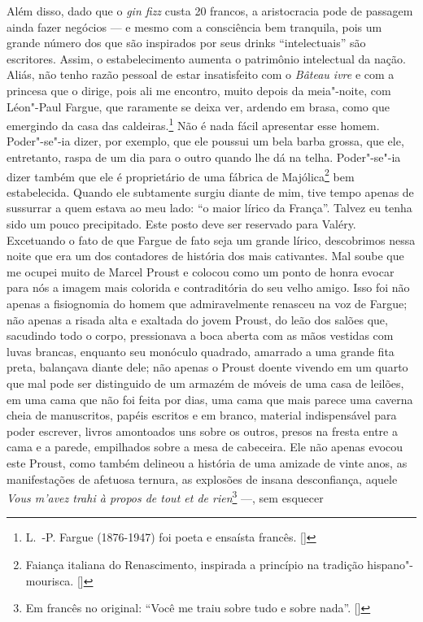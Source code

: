 Além disso, dado que o \emph{gin fizz} custa 20 francos, a aristocracia
pode de passagem ainda fazer negócios --- e mesmo com a consciência bem
tranquila, pois um grande número dos que são inspirados por seus
drinks ``intelectuais'' são escritores. Assim, o estabelecimento aumenta o patrimônio intelectual da nação. Aliás, não tenho razão pessoal de estar insatisfeito
com o \emph{Bâteau ivre} e com a princesa que o dirige, pois ali me
encontro, muito depois da meia"-noite, com Léon"-Paul Fargue, que raramente se deixa ver, ardendo em brasa, como que emergindo da casa das
caldeiras.\footnote{L.~-P. Fargue (1876-1947) foi poeta e
  ensaísta francês. []} Não é nada fácil apresentar esse homem.
Poder"-se"-ia dizer, por exemplo, que ele poussui um bela barba grossa,
que ele, entretanto, raspa de um dia para o outro quando lhe dá na
telha. Poder"-se"-ia dizer também que ele é proprietário de uma fábrica de
Majólica\footnote{Faiança italiana do Renascimento, inspirada a
  princípio na tradição hispano"-mourisca. []} bem estabelecida. Quando ele
subtamente surgiu diante de mim, tive tempo apenas de sussurrar a quem
estava ao meu lado: ``o maior lírico da França''. Talvez eu tenha sido
um pouco precipitado. Este posto deve ser reservado para Valéry.
Excetuando o fato de que Fargue de fato seja um grande lírico,
descobrimos nessa noite que era um dos contadores de história dos mais
cativantes. Mal soube que me ocupei muito de Marcel Proust e colocou
como um ponto de honra evocar para nós a imagem mais colorida e
contraditória do seu velho amigo. Isso foi não apenas a fisiognomia do
homem que admiravelmente renasceu na voz de Fargue; não apenas a risada
alta e exaltada do jovem Proust, do leão dos salões que, sacudindo todo
o corpo, pressionava a boca aberta com as mãos vestidas com luvas
brancas, enquanto seu monóculo quadrado, amarrado a uma grande fita
preta, balançava diante dele; não apenas o Proust doente vivendo em um
quarto que mal pode ser distinguido de um armazém de móveis de uma casa
de leilões, em uma cama que não foi feita por dias, uma cama que mais
parece uma caverna cheia de manuscritos, papéis escritos e em branco,
material indispensável para poder escrever, livros amontoados uns sobre
os outros, presos na fresta entre a cama e a parede, empilhados sobre a
mesa de cabeceira. Ele não apenas evocou este Proust, como também
delineou a história de uma amizade de vinte anos, as manifestações de
afetuosa ternura, as explosões de insana desconfiança, aquele \emph{Vous
m'avez trahi à propos de tout et de rien}\footnote{Em francês no original: ``Você me traiu sobre tudo e sobre nada''. []} ---, sem esquecer
